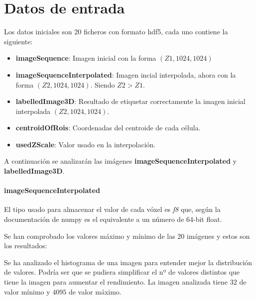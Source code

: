 \chapter{Datos de entrada}\label{requisitos}

Los datos iniciales son 20 ficheros con formato hdf5, cada uno contiene la siguiente:

\begin{itemize}
\item \textbf{imageSequence}: Imagen inicial con la forma $ (Z1, 1024, 1024) $
\item \textbf{imageSequenceInterpolated}: Imagen incial interpolada, ahora con la forma $ (Z2, 1024, 1024) $. Siendo $ Z2 > Z1 $. 
\item \textbf{labelledImage3D}: Resultado de etiquetar correctamente la imagen inicial interpolada $ (Z2, 1024, 1024) $.
\item \textbf{centroidOfRois}: Coordenadas del centroide de cada célula.
\item \textbf{usedZScale}: Valor usado en la interpolación.
\end{itemize}

A continuación se analizarán las imágenes \textbf{imageSequenceInterpolated} y \textbf{labelledImage3D}.

\subsubsection{imageSequenceInterpolated}

El tipo usado para almacenar el valor de cada vóxel es \textit{f8} que, según la documentación de numpy es el equivalente a un número de 64-bit float.

Se han comprobado los valores máximo y mínimo de las 20 imágenes y estos son los resultados:


Se ha analizado el histograma de una imagen para entender mejor la distribución de valores. Podría ser que se pudiera simplificar el nº de valores distintos que tiene la imagen para aumentar el rendimiento. La imagen analizada tiene $ 32 $ de valor mínimo y $ 4095 $ de valor máximo.

